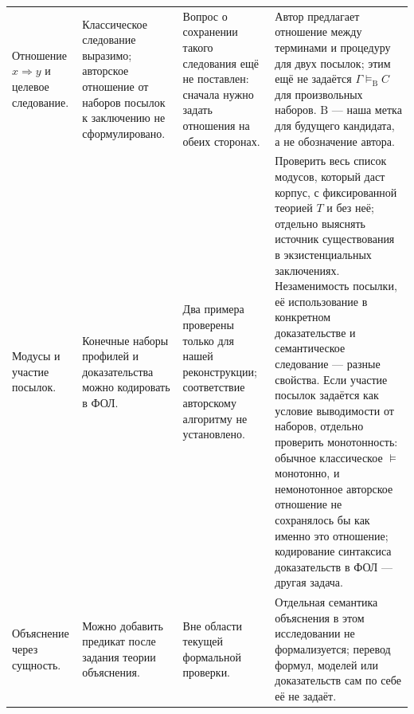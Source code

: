 \documentclass[12pt,a4paper]{article}
\begin{document}
\begin{longtable}{P{0.18\textwidth}P{0.15\textwidth}P{0.25\textwidth}P{0.32\textwidth}}
Отношение \(x\Rightarrow y\) и целевое следование. & Классическое следование выразимо; авторское отношение от наборов посылок к заключению не сформулировано. & Вопрос о сохранении такого следования ещё не поставлен: сначала нужно задать отношения на обеих сторонах. & Автор предлагает отношение между терминами и процедуру для двух посылок; этим ещё не задаётся \(\Gamma\allowbreak\models_{\mathrm{B}}\allowbreak C\) для произвольных наборов. \(\mathrm{B}\) — наша метка для будущего кандидата, а не обозначение автора. \\
Модусы и участие посылок. & Конечные наборы профилей и доказательства можно кодировать в ФОЛ. & Два примера проверены только для нашей реконструкции; соответствие авторскому алгоритму не установлено. & Проверить весь список модусов, который даст корпус, с фиксированной теорией \(T\) и без неё; отдельно выяснять источник существования в экзистенциальных заключениях. Незаменимость посылки, её использование в конкретном доказательстве и семантическое следование — разные свойства. Если участие посылок задаётся как условие выводимости от наборов, отдельно проверить монотонность: обычное классическое \(\models\) монотонно, и немонотонное авторское отношение не сохранялось бы как именно это отношение; кодирование синтаксиса доказательств в ФОЛ — другая задача. \\
Объяснение через сущность. & Можно добавить предикат после задания теории объяснения. & Вне области текущей формальной проверки. & Отдельная семантика объяснения в этом исследовании не формализуется; перевод формул, моделей или доказательств сам по себе её не задаёт. \\
\bottomrule
\end{longtable}
\normalsize
\end{document}
